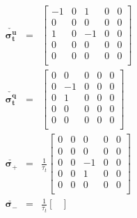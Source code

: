 \documentclass[notitlepage, superscriptaddress]{revtex4-2}
\begin{document}
\begin{eqnarray}
\boldsymbol{\check{\sigma^{u}_{t}}} &=& 
    \begin{bmatrix}
    -1 & 0 & 1 & 0 & 0  \\ 
    0 & 0 & 0 & 0 & 0  \\
    1 & 0 & -1 & 0 & 0  \\
    0 & 0 & 0 & 0 & 0  \\
    0 & 0 & 0 & 0 & 0  \\
    \end{bmatrix}   \\
%
\boldsymbol{\check{\sigma^{q}_{t}}} &=& 
    \begin{bmatrix}
    0 & 0 & 0 & 0 & 0  \\ 
    0 & -1 & 0 & 0 & 0  \\
    0 & 1 & 0 & 0 & 0  \\
    0 & 0 & 0 & 0 & 0  \\
    0 & 0 & 0 & 0 & 0  \\
    \end{bmatrix}   \\
%
\boldsymbol{\check{\sigma_{+}}} &=& \frac{1}{\tau_{t}}
    \begin{bmatrix}
    0 & 0 & 0 & 0 & 0  \\ 
    0 & 0 & 0 & 0 & 0  \\
    0 & 0 & -1 & 0 & 0  \\
    0 & 0 & 1 & 0 & 0  \\
    0 & 0 & 0 & 0 & 0  \\
    \end{bmatrix}   \\ 
%
\boldsymbol{\check{\sigma_{-}}} &=& \frac{1}{\tau_{t}}
    \begin{bmatrix}

\end{bmatrix}
\end{eqnarray}
\end{document}
